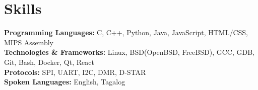 \documentclass[10pt,letterpaper]{article}
\begin{document}
\section{Skills}
\begin{itemize}[leftmargin=0.15in, label={}]
    \small{\item{
     \textbf{Programming Languages:} C, C++, Python, Java, JavaScript, HTML/CSS, MIPS Assembly \\
     \textbf{Technologies \& Frameworks:} Linux, BSD(OpenBSD, FreeBSD), GCC, GDB, Git, Bash, Docker, Qt, React \\
     \textbf{Protocols:} SPI, UART, I2C, DMR, D-STAR \\
     \textbf{Spoken Languages:} English, Tagalog \\ 
    }}
\end{itemize}
\end{document}
